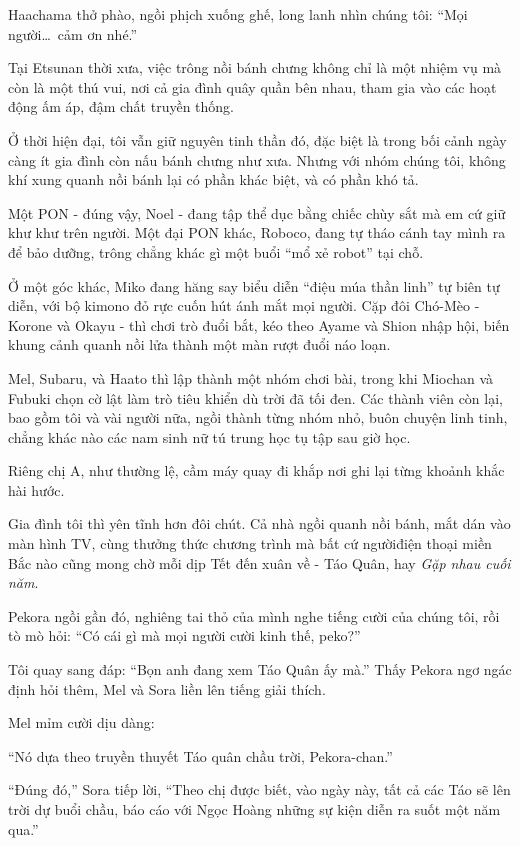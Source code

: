 \documentclass[../main.tex]{subfiles}
\begin{document}
Haachama thở phào, ngồi phịch xuống ghế, long lanh nhìn chúng tôi: ``Mọi người\dots\ cảm ơn nhé.''

\ct

Tại Etsunan thời xưa, việc trông nồi bánh chưng không chỉ là một nhiệm vụ mà còn là một thú vui, nơi cả gia đình quây quần bên nhau, tham gia vào các hoạt động ấm áp, đậm chất truyền thống.

Ở thời hiện đại, tôi vẫn giữ nguyên tinh thần đó, đặc biệt là trong bối cảnh ngày càng ít gia đình còn nấu bánh chưng như xưa. Nhưng với nhóm chúng tôi, không khí xung quanh nồi bánh lại có phần khác biệt, và có phần khó tả.

Một PON - đúng vậy, Noel - đang tập thể dục bằng chiếc chùy sắt mà em cứ giữ khư khư trên người. Một đại PON khác, Roboco, đang tự tháo cánh tay mình ra để bảo dưỡng, trông chẳng khác gì một buổi ``mổ xẻ robot'' tại chỗ.

Ở một góc khác, Miko đang hăng say biểu diễn ``điệu múa thần linh'' tự biên tự diễn, với bộ kimono đỏ rực cuốn hút ánh mắt mọi người. Cặp đôi Chó-Mèo - Korone và Okayu - thì chơi trò đuổi bắt, kéo theo Ayame và Shion nhập hội, biến khung cảnh quanh nồi lửa thành một màn rượt đuổi náo loạn.

Mel, Subaru, và Haato thì lập thành một nhóm chơi bài, trong khi Miochan và Fubuki chọn cờ lật làm trò tiêu khiển dù trời đã tối đen. Các thành viên còn lại, bao gồm tôi và vài người nữa, ngồi thành từng nhóm nhỏ, buôn chuyện linh tinh, chẳng khác nào các nam sinh nữ tú trung học tụ tập sau giờ học.

Riêng chị A, như thường lệ, cầm máy quay đi khắp nơi ghi lại từng khoảnh khắc hài hước.

Gia đình tôi thì yên tĩnh hơn đôi chút. Cả nhà ngồi quanh nồi bánh, mắt dán vào màn hình TV, cùng thưởng thức chương trình mà bất cứ ngườiđiện thoại miền Bắc nào cũng mong chờ mỗi dịp Tết đến xuân về - Táo Quân, hay \textit{Gặp nhau cuối năm}.

Pekora ngồi gần đó, nghiêng tai thỏ của mình nghe tiếng cười của chúng tôi, rồi tò mò hỏi: ``Có cái gì mà mọi người cười kinh thế, peko?''

Tôi quay sang đáp: ``Bọn anh đang xem Táo Quân ấy mà.'' Thấy Pekora ngơ ngác định hỏi thêm, Mel và Sora liền lên tiếng giải thích.

Mel mỉm cười dịu dàng:

``Nó dựa theo truyền thuyết Táo quân chầu trời, Pekora-chan.''

``Đúng đó,'' Sora tiếp lời, ``Theo chị được biết, vào ngày này, tất cả các Táo sẽ lên trời dự buổi chầu, báo cáo với Ngọc Hoàng những sự kiện diễn ra suốt một năm qua.''
\end{document}
